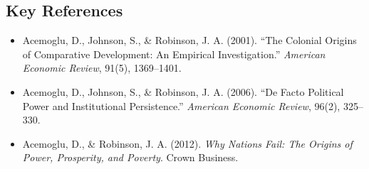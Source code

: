\subsection*{Key References}
\begin{itemize}
    \item Acemoglu, D., Johnson, S., \& Robinson, J. A. (2001). ``The Colonial Origins of Comparative Development: An Empirical Investigation.'' \textit{American Economic Review}, 91(5), 1369--1401.
    \item Acemoglu, D., Johnson, S., \& Robinson, J. A. (2006). ``De Facto Political Power and Institutional Persistence.'' \textit{American Economic Review}, 96(2), 325--330.
    \item Acemoglu, D., \& Robinson, J. A. (2012). \textit{Why Nations Fail: The Origins of Power, Prosperity, and Poverty}. Crown Business.
\end{itemize}
